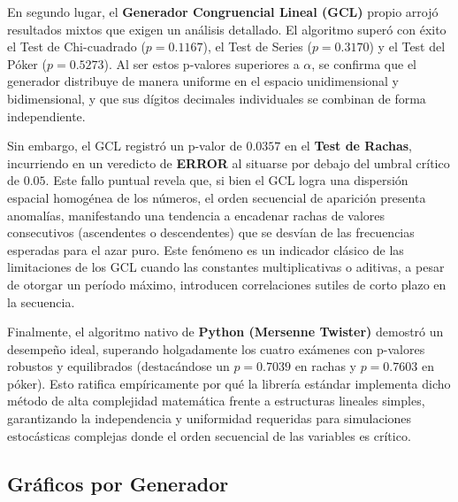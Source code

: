 \documentclass{article}
\begin{document}
En segundo lugar, el \textbf{Generador Congruencial Lineal (GCL)} propio arrojó resultados mixtos que exigen un análisis detallado. El algoritmo superó con éxito el Test de Chi-cuadrado ($p = 0.1167$), el Test de Series ($p = 0.3170$) y el Test del Póker ($p = 0.5273$). Al ser estos p-valores superiores a $\alpha$, se confirma que el generador distribuye de manera uniforme en el espacio unidimensional y bidimensional, y que sus dígitos decimales individuales se combinan de forma independiente.

Sin embargo, el GCL registró un p-valor de $0.0357$ en el \textbf{Test de Rachas}, incurriendo en un veredicto de \textbf{ERROR} al situarse por debajo del umbral crítico de $0.05$. Este fallo puntual revela que, si bien el GCL logra una dispersión espacial homogénea de los números, el orden secuencial de aparición presenta anomalías, manifestando una tendencia a encadenar rachas de valores consecutivos (ascendentes o descendentes) que se desvían de las frecuencias esperadas para el azar puro. Este fenómeno es un indicador clásico de las limitaciones de los GCL cuando las constantes multiplicativas o aditivas, a pesar de otorgar un período máximo, introducen correlaciones sutiles de corto plazo en la secuencia.

Finalmente, el algoritmo nativo de \textbf{Python (Mersenne Twister)} demostró un desempeño ideal, superando holgadamente los cuatro exámenes con p-valores robustos y equilibrados (destacándose un $p = 0.7039$ en rachas y $p = 0.7603$ en póker). Esto ratifica empíricamente por qué la librería estándar implementa dicho método de alta complejidad matemática frente a estructuras lineales simples, garantizando la independencia y uniformidad requeridas para simulaciones estocásticas complejas donde el orden secuencial de las variables es crítico.

\subsection{Gráficos por Generador}

\nobreak
\end{document}
